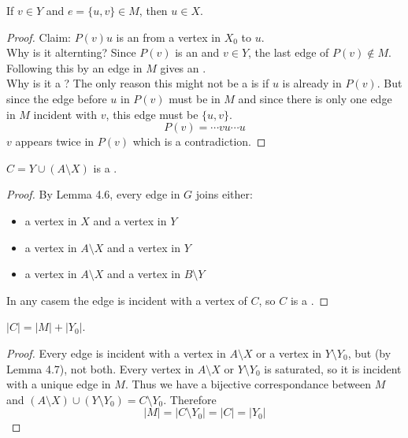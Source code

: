\documentclass[english, 11pt]{article}
\begin{document}
  \begin{lem}
    If $v \in Y$ and $e = \{u,v\} \in M$, then $u \in X$.
  \end{lem}
  \begin{proof}
    Claim: $P(v)u$ is an  from a vertex in $X_0$ to $u$. \\ Why is it alternting? Since $P(v)$ is an  and $v \in Y$, the last edge of $P(v) \not \in M$. Following this by an edge in $M$ gives an . \\ Why is it a ? The only reason this might not be a  is if $u$ is already in $P(v)$. But since the edge before $u$ in $P(v)$ must be in $M$ and since there is only one edge in $M$ incident with $v$, this edge must be $\{u,v\}$.
    \[ P(v) = \cdots vu \cdots u \]
    $v$ appears twice in $P(v)$ which is a contradiction.
  \end{proof}

  \begin{lem}
    $C = Y \cup (A \setminus X)$ is a .
  \end{lem}
  \begin{proof}
    By Lemma 4.6, every edge in $G$ joins either:
    \begin{itemize}
      \item a vertex in $X$ and a vertex in $Y$
      \item a vertex in $A\setminus X$ and a vertex in $Y$
      \item a vertex in $A\setminus X$ and a vertex in $B \setminus Y$
    \end{itemize}
    In any casem the edge is incident with a vertex of $C$, so $C$ is a .
  \end{proof}

  \begin{lem}
    $|C| = |M| + |Y_0|$.
  \end{lem}
  \begin{proof}
    Every  edge is incident with a vertex in $ A \setminus X$ or a vertex in $Y \setminus Y_0$, but (by Lemma 4.7), not both. Every vertex in $A \setminus X$ or $Y \setminus Y_0$ is \nameref
    {saturated}, so it is incident with a unique edge in $M$. Thus we have a bijective correspondance between $M$ and $(A \setminus X )\cup( Y \setminus Y_0) = C \setminus Y_0$. Therefore
    \[ |M| = |C\setminus Y_0| = |C| = |Y_0| \]
  \end{proof}
\end{document}
